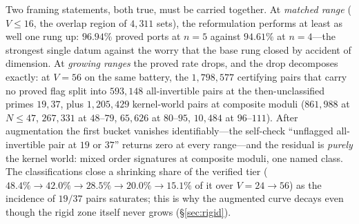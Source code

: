 \documentclass[11pt,a4paper]{article}
\numberwithin{equation}{section}
\theoremstyle{plain}
\theoremstyle{definition}
\theoremstyle{remark}
\begin{document}
\begin{center}
\end{center}

Two framing statements, both true, must be carried together. At
\emph{matched range} ($V\le 16$, the overlap region of $4{,}311$ sets),
the reformulation performs at least as well one rung up: $96.94\%$ proved
ports at $n=5$ against $94.61\%$ at $n=4$---the strongest single datum
against the worry that the base rung closed by accident of dimension. At
\emph{growing ranges} the proved rate drops, and the drop decomposes
exactly: at $V=56$ on the same battery, the $1{,}798{,}577$ certifying
pairs that carry no proved flag split into $593{,}148$
all-invertible pairs at the then-unclassified primes $19,37$, plus
$1{,}205{,}429$ kernel-world pairs at composite moduli
($861{,}988$ at $N\le47$, $267{,}331$ at $48$--$79$, $65{,}626$ at
$80$--$95$, $10{,}484$ at $96$--$111$). After augmentation the first bucket vanishes
identifiably---the self-check ``unflagged all-invertible pair at $19$ or
$37$'' returns zero at every range---and the residual is \emph{purely}
the kernel world: mixed order signatures at composite moduli, one named
class. The classifications close a shrinking share of the verified tier
($48.4\%\to42.0\%\to28.5\%\to20.0\%\to15.1\%$ of it over $V=24\to56$) as the
incidence of $19/37$ pairs saturates; this is why the augmented curve
decays even though the rigid zone itself never grows
(\S\ref{sec:rigid}).
\end{document}
